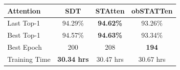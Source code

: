 \documentclass[../main.tex]{subfiles}
\begin{document}
\begin{tabular}{lccc}\toprule

Attention &SDT &STAtten &obSTATTen\\\midrule

Last Top-1	& 94.29\%	& \textbf{94.62\%}	&93.26\%\\
Best Top-1	& 94.57\%	& \textbf{94.63\%}	&93.34\%\\
Best Epoch	& 200		& 208		& \textbf{194}	\\
Training Time & \textbf{30.34 hrs} & 30.47 hrs & 30.67 hrs  \\\bottomrule

\end{tabular}
\end{document}
